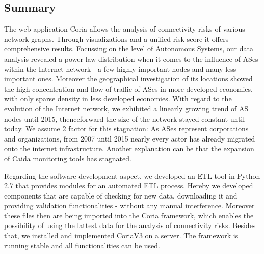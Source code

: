 \documentclass[conference, 11pt]{IEEEtran}
\begin{document}
\subsection{Summary}

The web application Coria allows the analysis of connectivity risks of various network graphs. Through visualizations and a unified risk score it offers comprehensive results. Focussing on the level of Autonomous Systems, our data analysis revealed a power-law distribution when it comes to the influence of ASes within the Internet network - a few highly important nodes and many less important ones. Moreover the geographical investigation of its locations showed the high concentration and flow of traffic of ASes in more developed economies, with only sparse density in less developed economies. With regard to the evolution of the Internet network, we exhibited a linearly growing trend of AS nodes until 2015, thenceforward the size of the network stayed constant until today. We assume 2 factor for this stagnation: As ASes represent corporations and organizations, from 2007 until 2015 nearly every actor has already migrated onto the internet infrastructure. Another explanation can be that the expansion of Caida monitoring tools has stagnated.

Regarding the software-development aspect, we developed an ETL tool in Python 2.7 that provides modules for an automated ETL process. Hereby we developed components that are capable of checking for new data, downloading it and providing validation functionalities - without any manual interference. Moreover these files then are being imported into the Coria framework, which enables the possibility of using the lattest data for the analysis of connectivity risks. Besides that, we installed and implemented CoriaV3 on a server. The framework is running stable and all functionalities can be used. \\
 
\end{document}

